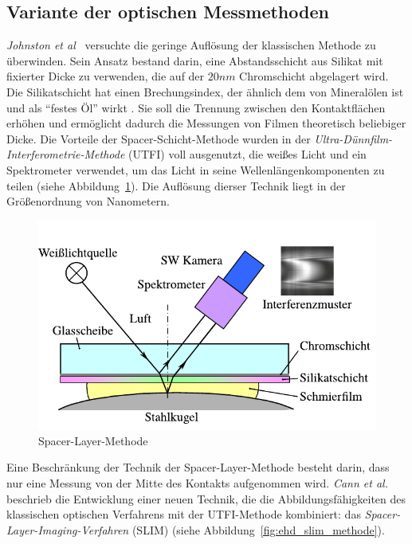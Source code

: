\subsection{Variante der optischen Messmethoden}
\label{sub:variante_der_optischen_messmethoden}

\textit{Johnston et al}~\cite{johnston_1991} versuchte die geringe Auflösung der klassischen Methode zu überwinden.
Sein Ansatz bestand darin, eine Abstandsschicht aus Silikat mit fixierter Dicke zu verwenden, die auf der $20 nm$ Chromschicht abgelagert wird.
Die Silikatschicht hat einen Brechungsindex, der ähnlich dem von Mineralölen ist und als ``festes Öl'' wirkt .
Sie soll die Trennung zwischen den Kontaktflächen erhöhen und ermöglicht dadurch die Messungen von Filmen theoretisch beliebiger Dicke.
Die Vorteile der Spacer-Schicht-Methode wurden in der \textit{Ultra-Dünnfilm-Interferometrie-Methode} (UTFI) voll ausgenutzt, die weißes Licht und ein Spektrometer verwendet, um das Licht in seine Wellenlängenkomponenten zu teilen (siehe Abbildung~\ref{fig:ehd_spacer_layer_johnston}).
Die Auflösung dierser Technik liegt in der Größenordnung von Nanometern.

\begin{figure}[htb]
    \centering
    \includegraphics[]{./images/spacer_layer_methode_furtuna.pdf}
    \caption{Spacer-Layer-Methode \cite{johnston_1991}}
    \label{fig:ehd_spacer_layer_johnston}
\end{figure}

Eine Beschränkung der Technik der Spacer-Layer-Methode besteht darin, dass nur eine Messung von der Mitte des Kontakts aufgenommen wird.
\textit{Cann et al.}~\cite{cann_1996} beschrieb die Entwicklung einer neuen Technik, die die Abbildungsfähigkeiten des klassischen optischen Verfahrens mit der UTFI-Methode kombiniert: das \textit{Spacer-Layer-Imaging-Verfahren} (SLIM) (siehe Abbildung~\ref{fig:ehd_slim_methode}).

